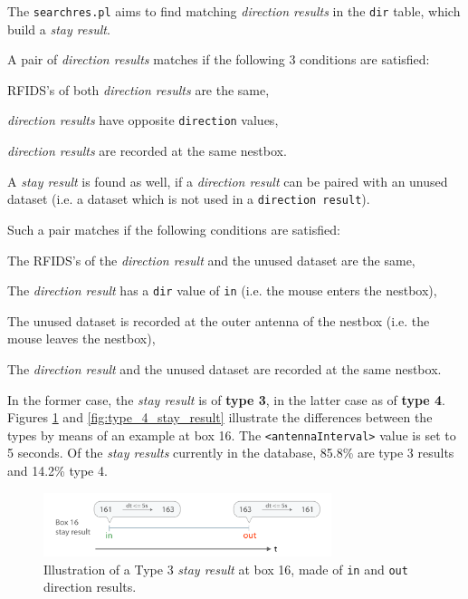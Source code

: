 The \lstinline|searchres.pl| aims to find matching \textit{direction results} in the \lstinline|dir| table, which build a \textit{stay result}.

A pair of \textit{direction results} matches if the following 3 conditions are satisfied:

\begin{mylist}
\item RFIDS's of both \textit{direction results} are the same,
\item \textit{direction results} have opposite \lstinline|direction| values,
\item \textit{direction results} are recorded at the same nestbox.
\end{mylist}

A \textit{stay result} is found as well, if a \textit{direction result} can be paired with an unused dataset (i.e. a dataset which is not used in a \lstinline|direction result|). 

Such a pair matches if the following conditions are satisfied:
 
\begin{mylist}
	\item The RFIDS's of the \textit{direction result} and the unused dataset are the same,
	\item The \textit{direction result} has a \lstinline|dir| value of \lstinline|in| (i.e. the mouse enters the nestbox),
	\item The unused dataset is recorded at the outer antenna of the nestbox (i.e. the mouse leaves the nestbox),
	\item The \textit{direction result} and the unused dataset are recorded at the same nestbox.  
\end{mylist}

In the former case, the \textit{stay result} is of \textbf{type 3}, in the latter case as of \textbf{type 4}. Figures \ref{fig:type_3_stay_result} and \ref{fig:type_4_stay_result} illustrate the differences between the types by means of an example at box 16. The \lstinline|<antennaInterval>| value is set to 5 seconds. Of the \textit{stay results} currently in the database, 85.8\% are type 3 results and 14.2\% type 4. 

\begin{figure}[htpb]
\begin{center}
  \includegraphics[width=0.75\textwidth]{assets/pdf/stay_result_type_3_schema.pdf}
  \caption[Illustration of a type 3 \textit{stay result}]{Illustration of a Type 3 \textit{stay result} at box 16,  made of \lstinline|in| and \lstinline|out| direction results.}
  \label{fig:type_3_stay_result}
\end{center}
\end{figure}

